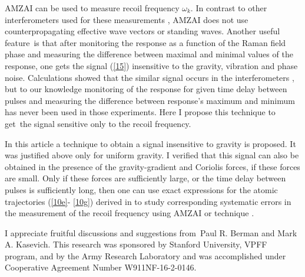 \documentclass[twocolumn,showpacs,preprintnumbers]{revtex4}
\begin{document}
AMZAI can be used to measure recoil frequency $\omega _{k}.$ In contrast to
other interferometers used for these measurements \cite{c17,c20,c9,c19,c14},
AMZAI does not use counterpropagating effective wave vectors or standing
waves. Another useful feature\ is that after monitoring the response as a
function of the Raman field phase and measuring the difference between
maximal and minimal values of the response, one gets the signal (\ref{15})
insensitive to the gravity, vibration and phase noise. Calculations showed
that the similar signal occurs in the interferometers \cite{c9,c19,c14}, but
to our knowledge monitoring of the response for given time delay between
pulses and measuring the difference between response's maximum and minimum
has never been used in those experiments. Here I propose this technique to
get\ the signal sensitive only to the recoil frequency.

In this article a technique to obtain a signal insensitive to gravity is
proposed. It was justified above only for uniform gravity. I verified that
this signal can also be obtained in the presence of the gravity-gradient and
Coriolis forces, if these forces are small. Only if these forces are
sufficiently large, or the time delay between pulses is sufficiently long,
then one can use exact expressions for the atomic trajectories (\ref{10e}-%
\ref{10g}) derived in \cite{c34} to study corresponding systematic errors in
the measurement of the recoil frequency using AMZAI or technique \cite{c14}.

\acknowledgments

I appreciate fruitful discussions and suggestions from\ Paul R. Berman and
Mark A. Kasevich. This research was sponsored by Stanford University, VPFF
program, and by the Army Research Laboratory and was accomplished under
Cooperative Agreement Number W911NF-16-2-0146.
\end{document}
